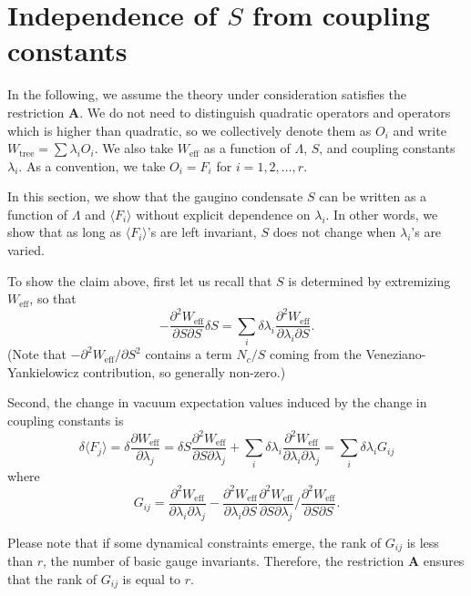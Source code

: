 \documentclass[a4paper,12pt]{article}
\def\ex#1{\langle#1\rangle}
\def\W#1{W_{\text{#1}}}
\begin{document}
\section{Independence of $S$ from coupling constants}
In the following,
we assume the theory under consideration satisfies
the restriction \textbf{A}.
We do not need to distinguish quadratic operators
and operators which is higher than quadratic, so we collectively denote them
as $O_i$ and write $\W{tree}=\sum\lambda_iO_i$. We also take $\W{eff}$ as
a function of $\Lambda$, $S$, and coupling constants $\lambda_i$.
As a convention, we take $O_i=F_i$ for $i=1,2,\ldots,r$.

In this section, we show that the gaugino condensate $S$ can be written as
a function of $\Lambda$ and $\ex{F_i}$
without explicit dependence on $\lambda_i$.
In other words, we show that as long as
$\ex{F_i}$'s are left  invariant, $S$ does not change
when $\lambda_i$'s  are varied.

To show the claim above, first let us recall
that $S$ is determined by extremizing $\W{eff}$,
so that\begin{equation}
-\frac{\partial^2\W{eff}}{\partial S\partial S}\delta S
=\sum_i \delta\lambda_i\frac{\partial^2\W{eff}}{\partial\lambda_i\partial S}.
\end{equation}(Note that $-{\partial^2\W{eff}}/\partial S^2$ contains a term $N_c/S$
coming from the Veneziano-Yankielowicz contribution, so generally non-zero.)

Second, the change in vacuum expectation values induced by the change in coupling constants is
\begin{equation}
\delta\ex{F_j}=\delta\frac{\partial\W{eff}}{\partial\lambda_j}
=\delta S\frac{\partial^2\W{eff}}{\partial S\partial\lambda_j}+
\sum_i\delta \lambda_i
\frac{\partial^2\W{eff}}{\partial\lambda_i\partial\lambda_j}
=\sum_i\delta \lambda_i G_{ij}
\end{equation}where\begin{equation}
G_{ij}=
\frac{\partial^2\W{eff}}{\partial\lambda_i\partial\lambda_j}
-\frac{\partial^2\W{eff}}{\partial\lambda_i\partial S}
\frac{\partial^2\W{eff}}{\partial S\partial\lambda_j}\Big/
\frac{\partial^2\W{eff}}{\partial S\partial S}.
\end{equation}

Please note that if some dynamical constraints emerge,
the rank of $G_{ij}$ is less than $r$, the number of basic
gauge invariants.
Therefore, the restriction \textbf{A}
ensures that the rank of $G_{ij}$ is equal to $r$.
\end{document}
